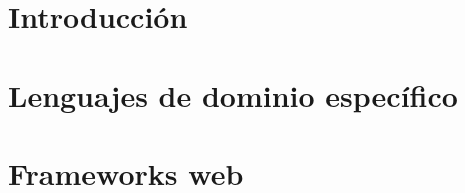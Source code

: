 \documentclass[12pt]{report}
\begin{document}
\chapter{Introducci\'on}

\chapter{Lenguajes de dominio espec\'ifico}

\chapter{Frameworks web}



\end{document}
